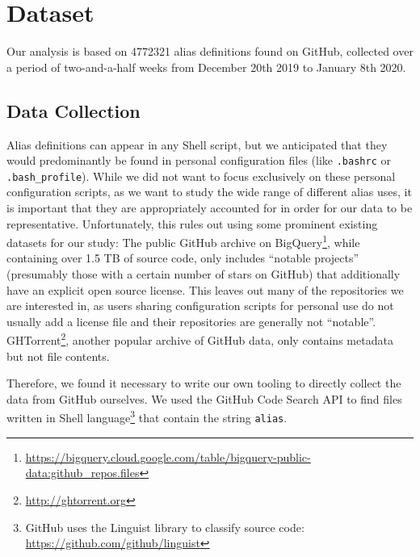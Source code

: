 \section{Dataset}

Our analysis is based on \num{4772321} alias definitions found on GitHub, collected over a period of two-and-a-half weeks from December 20th 2019 to January 8th 2020.

\subsection{Data Collection}

Alias definitions can appear in any Shell script, but we anticipated that they would predominantly be found in personal configuration files (like \verb|.bashrc| or \verb|.bash_profile|).
While we did not want to focus exclusively on these personal configuration scripts, as we want to study the wide range of different alias uses, it is important that they are appropriately accounted for in order for our data to be representative.
Unfortunately, this rules out using some prominent existing datasets for our study:
The public GitHub archive on BigQuery\footnote{\url{https://bigquery.cloud.google.com/table/bigquery-public-data:github_repos.files}}, while containing over 1.5 TB of source code, only includes ``notable projects'' (presumably those with a certain number of stars on GitHub) that additionally have an explicit open source license. 
This leaves out many of the repositories we are interested in, as users sharing configuration scripts for personal use do not usually add a license file and their repositories are generally not ``notable''.
GHTorrent\footnote{\url{http://ghtorrent.org}}, another popular archive of GitHub data, only contains metadata but not file contents.

Therefore, we found it necessary to write our own tooling to directly collect the data from GitHub ourselves.
We used the GitHub Code Search API to find files written in Shell language\footnote{GitHub uses the Linguist library to classify source code: \url{https://github.com/github/linguist}} that contain the string \verb|alias|.

